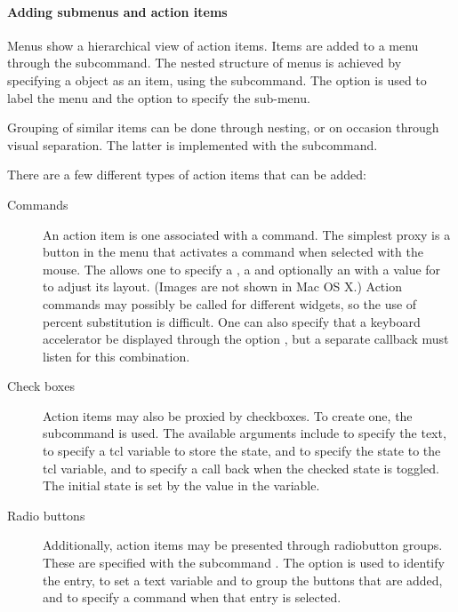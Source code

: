 \paragraph{Adding submenus and action items}
Menus show a hierarchical view of action items. Items are added to a
menu through the  subcommand.  The nested
structure of menus is achieved by specifying a  object as
an item, using the  subcommand. The
option  is used to label the menu and the 
option to specify the sub-menu.

Grouping of similar items can be done through nesting, or on occasion
through visual separation. The latter is implemented with the  subcommand.


There are a few different types of action items that can be added:
 
\begin{description}
\item[Commands] An action item is one associated with a command. The
  simplest proxy is a button in the menu that activates a command when
  selected with the mouse. The  allows
  one to specify a , a  and optionally an
   with a value for  to adjust its
  layout. (Images are not shown in Mac OS X.) Action commands may
  possibly be called for different widgets, so the use of percent
  substitution is difficult. One can also specify that a keyboard
  accelerator be displayed through the option , but
  a separate callback must listen for this combination.

\item[Check boxes] Action items may also be proxied by checkboxes. To
  create one, the subcommand  is
  used. The available arguments include  to specify the
  text,  to specify a tcl variable to store the state,
   and  to specify the state to the tcl
  variable, and  to specify a call back when the checked
  state is toggled. The initial state is set by the value in the
  \TCL\/ variable.

\item[Radio buttons] Additionally, action items may be presented
  through radiobutton groups. These are specified with the subcommand
  . The  option is
  used to identify the entry,  to set a text variable
  and to group the buttons that are added, and  to
  specify a command when that entry is selected.
\end{description}

